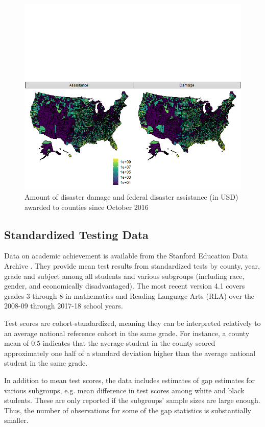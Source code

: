 \begin{figure}[!h]
	\centering
	\includegraphics[scale=0.7]{"../Code & Data/AssistanceMap.png"}
	\caption{Amount of disaster damage and federal disaster assistance (in USD) awarded to counties since October 2016}
	\label{AssistanceMap}
\end{figure}




\subsection{Standardized Testing Data}

Data on academic achievement is available from the Stanford Education Data Archive \citep{SEDA}. They provide mean test results from standardized tests by county, year, grade and subject among all students and various subgroups (including race, gender, and economically disadvantaged). The most recent version 4.1 covers grades 3 through 8 in mathematics and Reading Language Arts (RLA) over the 2008-09 through 2017-18 school years.

Test scores are cohort-standardized, meaning they can be interpreted relatively to an average national reference cohort in the same grade. For instance, a county mean of 0.5 indicates that the average student in the county scored approximately one half of a standard deviation higher than the average national student in the same grade.

In addition to mean test scores, the data includes estimates of gap estimates for various subgroups, e.g. mean difference in test scores among white and black students. These are only reported if the subgroups' sample sizes are large enough. Thus, the number of observations for some of the gap statistics is substantially smaller.

